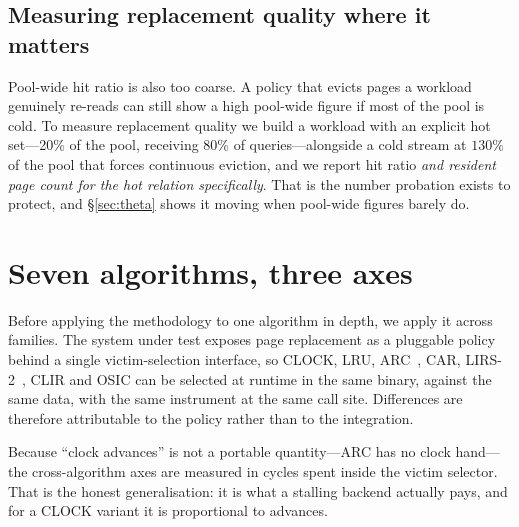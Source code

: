 \documentclass[sigconf,nonacm]{acmart}
\begin{document}
\subsection{Measuring replacement quality where it matters}

Pool-wide hit ratio is also too coarse. A policy that evicts pages a workload
genuinely re-reads can still show a high pool-wide figure if most of the pool
is cold. To measure replacement quality we build a workload with an explicit
hot set---20\% of the pool, receiving 80\% of queries---alongside a cold stream
at $130\%$ of the pool that forces continuous eviction, and we report hit ratio
\emph{and resident page count for the hot relation specifically}. That is the
number probation exists to protect, and \S\ref{sec:theta} shows it moving when
pool-wide figures barely do.

\section{Seven algorithms, three axes}
\label{sec:algos}

Before applying the methodology to one algorithm in depth, we apply it across
families. The system under test exposes page replacement as a pluggable
policy behind a single victim-selection interface, so CLOCK, LRU,
ARC~\cite{megiddo2003arc}, CAR, LIRS-2~\cite{jiang2002lirs}, CLIR and OSIC can
be selected at runtime in the same binary, against the same data, with the same
instrument at the same call site. Differences are therefore attributable to the
policy rather than to the integration.

Because ``clock advances'' is not a portable quantity---ARC has no clock
hand---the cross-algorithm axes are measured in cycles spent inside the victim
selector. That is the honest generalisation: it is what a stalling backend
actually pays, and for a CLOCK variant it is proportional to advances.
\end{document}
